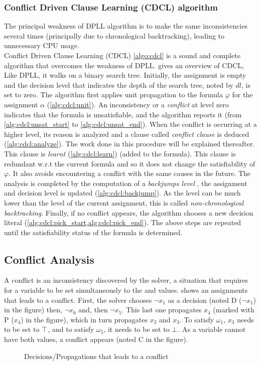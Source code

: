 \subsubsection{Conflict Driven Clause Learning (CDCL) algorithm}\label{sec:cdcl}
The principal weakness of DPLL algorithm is to make the same inconsistencies several times
(principally due to chronological backtracking), leading to  unnecessary CPU usage.\\
Conflict Driven Clause Learning (CDCL) \cref{algo:cdcl} is a sound and complete algorithm
that overcomes the weakness of DPLL.
 gives an overview of CDCL, Like DPLL,  it walks on a binary search tree.
Initially, the  assignment is empty and the decision level that 
indicates the depth of the search tree, noted by $dl$, is set to zero.
The algorithm first applies unit propagation to the formula $\varphi$ for the  assignment $\alpha$ (\cref{alg:cdcl:unit}).
An inconsistency or a \emph{conflict} at level zero indicates that the formula is unsatisfiable, and the algorithm
reports it (from \cref{alg:cdcl:unsat_start} to \cref{alg:cdcl:unsat_end}). When the conflict is occurring at a higher level, its reason is analyzed and a clause called \emph{conflict clause} is deduced (\cref{alg:cdcl:analyze}).
The work done in this procedure will be explained thereafter.
This clause is \emph{learnt} (\cref{alg:cdcl:learn}) (added to the formula). This clause is redundant w.r.t the current
formula and so it does not change the satisfiability of $\varphi$. It also avoids encountering a conflict with the same
causes in the future.
The analysis is completed by the computation of a \emph{backjumps level} , the assignment and decision level is updated (\cref{alg:cdcl:backjump}). As the level can be much lower than the level of the current assignment, this is called \emph{non-chronological backtracking}.
Finally, if no conflict appears, the algorithm chooses a new decision literal 
(\cref{alg:cdcl:pick_start,alg:cdcl:pick_end}).
The above steps are repeated until the satisfiability status of the
formula is determined.

\subsection{Conflict Analysis}
A conflict is an inconsistency discovered by the solver, a situation that requires for a variable to be set 
simultaneously to the \true and \false values.  shows an assignments that leads to a conflict.
First, the solver chooses $\neg x_1$ as a decision (noted D ($\neg x_1$) in the figure) then, $\neg x_6$ and, then $\neg x_5$. This last one propagates $x_4$ (marked with P ($x_4$) in the figure),
which in turn propagates $x_2$ and $x_3$.
To satisfy $\omega_1$, $x_3$ needs to be set to $\top$, and  to satisfy $\omega_5$, 
it needs to be set to $\bot$. As a variable cannot have both values, a conflict appears (noted C in the figure).
\begin{figure}[!htbp]
 \centering
  
 \caption{Decisions/Propagations that leads to a  conflict}
 \label{fig:conflict}
\end{figure}

